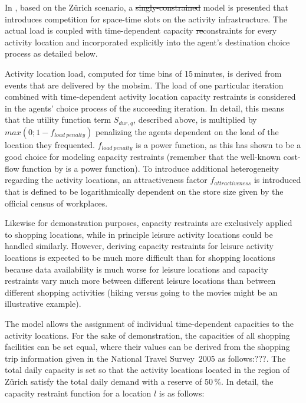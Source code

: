 In \citet[][]{HorniEtAl_TRR_2009}, based on the Zürich scenario, a \st{singly-constrained} model is presented that introduces competition for space-time slots on the activity infrastructure. 
The actual load is coupled with time-dependent capacity \st{re}{\orange con}straints for every activity location and incorporated explicitly into the agent's destination choice process as detailed below.   

Activity location load, computed for time bins of 15\,minutes, is derived from events that are delivered by the \gls{mobsim}. 
The load of one particular iteration combined with time-dependent activity location capacity restraints is considered in the agents' choice process of the succeeding iteration. 
In detail, this means that the utility function term $S_{dur,q}$, described above, is multiplied by $max(0; 1 - f_{load\ penalty})$ penalizing the agents dependent on the load of the location they frequented. 
$f_{load\ penalty}$ is a power function, as this has shown to be a good choice for modeling capacity restraints (remember that the well-known cost-flow function by \citet[][]{TA_manual_1964} is a power function). 
To introduce additional heterogeneity regarding the activity locations, an attractiveness factor $f_{attractiveness}$ is introduced that is defined to be logarithmically dependent on the store size given by the official census of workplaces.

Likewise for demonstration purposes, capacity restraints are exclusively applied to shopping locations, while in principle leisure activity locations could be handled similarly. However, deriving capacity restraints for leisure activity locations is expected to be much more difficult than for shopping locations because data availability is much worse for leisure locations and capacity restraints vary much more between different leisure locations than between different shopping activities (hiking versus going to the movies might be an illustrative example).

The model allows the assignment of individual time-dependent capacities to the activity locations. For the sake of demonstration, the capacities of all shopping facilities can be set equal, where their values can be derived from the shopping trip information given in the National Travel Survey~2005 {\orange as follows:???}. The total daily capacity is set so that the activity locations located in the region of Zürich satisfy the total daily demand with a reserve of 50\,\%. In detail, the capacity restraint function for a location $l$ is as follows:

